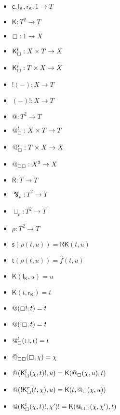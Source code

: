 \documentclass{llncs}
\renewcommand{\:}{\colon}
\begin{document}
\begin{itemize}
  \item $\mathsf{c}, \mathsf{l}_{\mathsf{K}}, \mathsf{r}_{\mathsf{K}} : 1 \rightarrow T$
  \item $\mathsf{K} : T^{2} \rightarrow T$
  \item $\boxempty : 1 \rightarrow X$
  \item $\mathsf{K}_{\boxempty}^{l} : X \times T \rightarrow X$
  \item $\mathsf{K}_{\boxempty}^{r} : T \times X \rightarrow X$
  \item $!(-) : X  \rightarrow T$
  \item $(-)! : X  \rightarrow T$
  \item $@ : T^{2} \rightarrow T$
  \item $@_{\boxempty}^{l} : X \times T \rightarrow T$
  \item $@_{\boxempty}^{r} : T \times X \rightarrow X$
  \item $@_{\boxempty\boxempty} : X^{2} \rightarrow X$
  \item $\mathsf{R} : T \rightarrow T$
  \item $\bindnasrepma_{\rho} : T^{2} \rightarrow T$
  \item $\sqcup_{\rho} : T^{2} \rightarrow T$
  \item $\rho : T^{2} \rightarrow T$             %
  \item $\mathsf{s}(\rho(t,u)) = \mathsf{R}\mathsf{K}(t, u)$ 
  \item $\mathsf{t}(\rho(t,u)) = \hat{f}(t,u)$          %
  \item $\mathsf{K}(\mathsf{l}_{\mathsf{K}}, u) = u$
  \item $\mathsf{K}(t, \mathsf{r}_{\mathsf{K}}) = t$
  \item $@(\boxempty !,t) = t$
  \item $@(!\boxempty,t) = t$
  \item $@_{\boxempty}^{l}(\boxempty ,t) = t$
  \item $@_{\boxempty\boxempty}(\boxempty,\chi) = \chi$
  \item $@(\mathsf{K}_{\boxempty}^{l} (\chi, t)!, u) = \mathsf{K}(@_{\boxempty}(\chi, u), t)$
  \item $@(!\mathsf{K}_{\boxempty}^{r} (t, \chi), u) = \mathsf{K}(t, @_{\boxempty}(\chi, u))$
  \item $@(\mathsf{K}_{\boxempty}^{l} (\chi, t)!, \chi')! = \mathsf{K}(@_{\boxempty\boxempty}(\chi, \chi'), t)$
\end{itemize}
\end{document}
